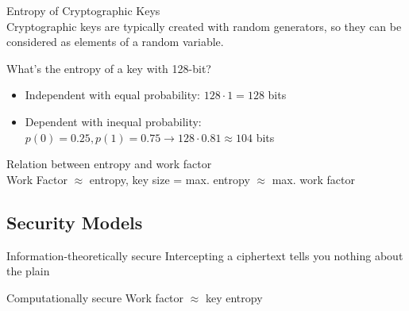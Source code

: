 \begin{concept}{Entropy of Cryptographic Keys}\\
    Cryptographic keys are typically created with random generators, so they can be considered as elements of a random variable.
    
    What's the entropy of a key with 128-bit?
    \begin{itemize}
        \item Independent with equal probability: $128 \cdot 1 = 128$ bits
        \item Dependent with inequal probability: $p(0) = 0.25, p(1) = 0.75 \rightarrow 128 \cdot 0.81 \approx 104$ bits
    \end{itemize}
\end{concept}

\begin{theorem}{Relation between entropy and work factor}\\
    Work Factor $\approx$ entropy, key size = max. entropy $\approx$ max. work factor
\end{theorem}

\subsection{Security Models}

\begin{definition}{Information-theoretically secure}
    Intercepting a ciphertext tells you nothing about the plain
\end{definition}

\begin{definition}{Computationally secure}
    Work factor $\approx$ key entropy
\end{definition}






